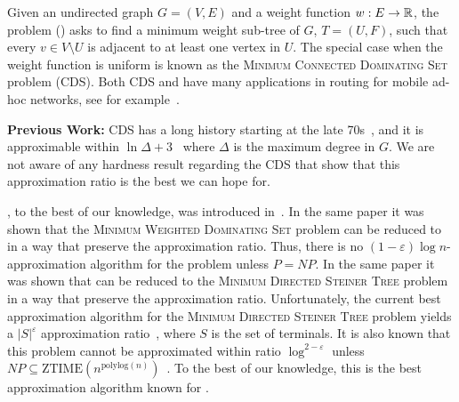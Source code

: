 % 

Given an undirected graph $G = (V, E)$ and a weight function $w:E \to \mathbb{R}$, 
the \Problem{} problem (\Prob{}) asks to find a minimum weight sub-tree of $G$, 
$T = (U, F)$, such that every $v \in V \setminus U$ is adjacent to at least one 
vertex in $U$.
The special case when the weight function is uniform is known as the 
\textsc{Minimum Connected Dominating Set} problem (CDS). 
Both CDS and \Prob{} have many applications in routing
for mobile ad-hoc networks, see for example~\cite{
shin2010approximation%
,cheng2003polynomial%
,das1997routing%
,adasme2016models%
,adasme2017minimum%
}.


\textbf{Previous Work:}
CDS has a long history starting at the late 70s~\cite{sampathkumar1979connected},
and it is approximable within $\ln\Delta + 3$~\cite{guha1998approximation} 
where $\Delta$ is the maximum degree in $G$.
We are not aware of any hardness result regarding the CDS that show that this approximation
ratio is the best we can hope for.

\Prob{}, to the best of our knowledge, was introduced in~\cite{shin2010approximation}.
In the same paper it was shown that the \textsc{Minimum Weighted Dominating Set} problem 
can be reduced to \Prob{} in a way that preserve the approximation ratio.
Thus, there is no $(1 - \varepsilon)\log n$-approximation algorithm for the \Prob{} problem
unless $P = NP$.
In the same paper it was shown that \Prob{} can be reduced to the 
\textsc{Minimum Directed Steiner Tree} problem in a way that preserve the approximation ratio.
Unfortunately, the current best approximation algorithm for the 
\textsc{Minimum Directed Steiner Tree} problem yields a $|S|^\varepsilon$ 
approximation ratio~\cite{charikar1999approximation},
where $S$ is the set of terminals.
It is also known that this problem cannot be approximated within ratio 
$\log^{2 - \varepsilon}$ 
unless $NP \subseteq \text{ZTIME}(n^{\text{polylog}(n)})$~\cite{halperin2003polylogarithmic}.
To the best of our knowledge, this is the best approximation algorithm known for \Prob{}.
     
